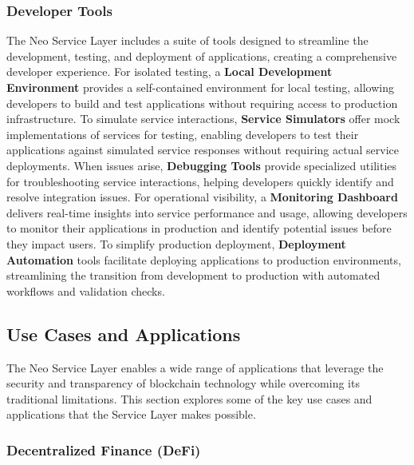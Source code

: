 \documentclass[12pt,a4paper]{article}
\begin{document}
\subsubsection{Developer Tools}
\label{subsubsec:developer-tools}

The Neo Service Layer includes a suite of tools designed to streamline the development, testing, and deployment of applications, creating a comprehensive developer experience. For isolated testing, a \textbf{Local Development Environment} provides a self-contained environment for local testing, allowing developers to build and test applications without requiring access to production infrastructure. To simulate service interactions, \textbf{Service Simulators} offer mock implementations of services for testing, enabling developers to test their applications against simulated service responses without requiring actual service deployments. When issues arise, \textbf{Debugging Tools} provide specialized utilities for troubleshooting service interactions, helping developers quickly identify and resolve integration issues. For operational visibility, a \textbf{Monitoring Dashboard} delivers real-time insights into service performance and usage, allowing developers to monitor their applications in production and identify potential issues before they impact users. To simplify production deployment, \textbf{Deployment Automation} tools facilitate deploying applications to production environments, streamlining the transition from development to production with automated workflows and validation checks.

\subsection{Use Cases and Applications}
\label{subsec:nsl-use-cases}

The Neo Service Layer enables a wide range of applications that leverage the security and transparency of blockchain technology while overcoming its traditional limitations. This section explores some of the key use cases and applications that the Service Layer makes possible.

\subsubsection{Decentralized Finance (DeFi)}
\label{subsubsec:defi}
\end{document}
